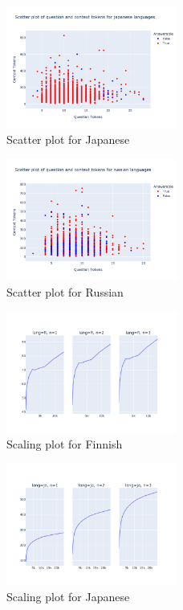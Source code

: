 \documentclass[11pt]{article}
\begin{document}
\begin{figure}[ht]
    \centering
    \includegraphics[width=0.5\textwidth]{week1_c_scatter_ja.png}
    \caption{Scatter plot for Japanese}
    \label{fig:scatter_week1_c_ja}
\end{figure}

\begin{figure}[ht]
    \centering
    \includegraphics[width=0.5\textwidth]{week1_c_scatter_ru.png}
    \caption{Scatter plot for Russian}
    \label{fig:scatter_week1_c_ru}
\end{figure}

\begin{figure}[ht]
    \centering
    \includegraphics[width=0.5\textwidth]{week2_scaling_fi.png}
    \caption{Scaling plot for Finnish}
    \label{fig:week2_scaling_fi}
\end{figure}

\begin{figure}[ht]
    \centering
    \includegraphics[width=0.5\textwidth]{week2_scaling_ja.png}
    \caption{Scaling plot for Japanese}
    \label{fig:week2_scaling_ja}
\end{figure}
\end{document}
